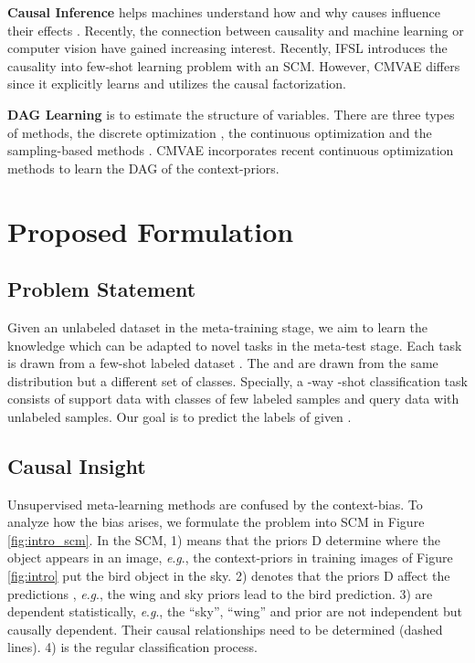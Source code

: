 \documentclass[letterpaper]{article} \usepackage{aaai23}  \usepackage{times}  \usepackage{helvet}  \usepackage{courier}  \usepackage[hyphens]{url}  \usepackage{graphicx} \urlstyle{rm} \def\UrlFont{\rm}  \usepackage{natbib}  \usepackage{caption} \frenchspacing  \setlength{\pdfpagewidth}{8.5in}  \setlength{\pdfpageheight}{11in}  \usepackage{algorithm}
\newcommand{\eg}{\textit{e}.\textit{g}.}
\theoremstyle{plain}
\theoremstyle{definition}
\theoremstyle{remark}
\begin{document}
\noindent\textbf{Causal Inference} helps machines understand how and why causes influence their effects \cite{glymour2016causal}. Recently, the connection between causality and machine learning \cite{magliacane2018domain, DBLP:conf/iclr/BengioDRKLBGP20, DBLP:conf/nips/KyonoZS20} or computer vision \cite{DBLP:conf/cvpr/Lopez-PazNCSB17, yang2021causal, DBLP:conf/cvpr/WangHZS20a} have gained increasing interest. Recently, IFSL \cite{yue2020inter} introduces the causality into few-shot learning problem with an SCM. However, CMVAE differs since it explicitly learns and utilizes the causal factorization.  

\noindent \textbf{DAG Learning} is to estimate the structure of variables. There are three types of methods, the discrete optimization \cite{scanagatta2016learning, viinikka2020towards}, the continuous optimization \cite{Zheng2018dags, zheng2020learning} and the sampling-based methods \cite{charpentier2021differentiable}. CMVAE incorporates recent continuous optimization methods to learn the DAG of the context-priors.









\section{Proposed Formulation}

\subsection{Problem Statement}  

Given an unlabeled dataset  in the meta-training stage, we aim to learn the knowledge which can be adapted to novel tasks in the meta-test stage. Each task  is drawn from a few-shot labeled dataset . The  and  are drawn from the same distribution but a different set of classes. Specially, a -way -shot classification task   consists of support data  with  classes of  few labeled samples and query data  with  unlabeled samples. Our goal is to  predict the labels of  given .

\subsection{Causal Insight} \label{sec:causal insight}

Unsupervised meta-learning methods are confused by the context-bias. To analyze how the bias arises, we formulate the problem into SCM in Figure \ref{fig:intro_scm}.
In the SCM, 1)  means that the priors D determine where the object appears in an image, \eg, the context-priors in training images of Figure \ref{fig:intro} put the bird object in the sky. 2)  denotes that the priors D affect the predictions , \eg, the wing and sky priors lead to the bird prediction. 3)  are dependent statistically, \eg,  the ``sky'', ``wing'' and  prior are not independent but causally dependent. Their causal relationships need to be determined (dashed lines).  4)  is the regular classification process. 
\end{document}
